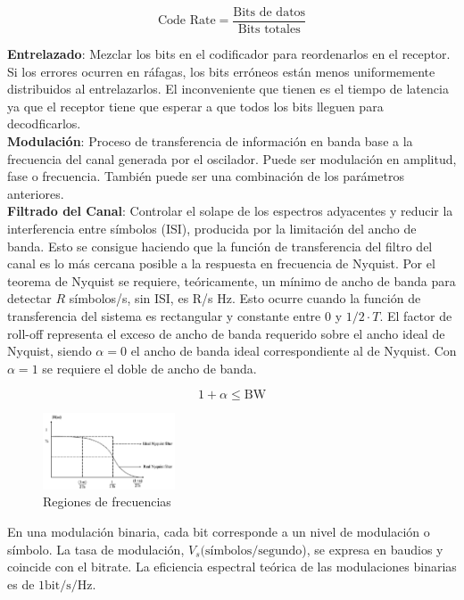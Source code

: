 \documentclass[10pt,portrait, twocolumn]{article}
\begin{document}
	\begin{equation*}
		\text{Code Rate} = \frac{\text{Bits de datos}}{\text{Bits totales}}
	\end{equation*}

\textbf{Entrelazado}:  Mezclar los bits en el codificador para reordenarlos en el receptor. Si los errores ocurren en ráfagas, los bits erróneos están menos uniformemente distribuidos al entrelazarlos. El inconveniente que tienen es el tiempo de latencia ya que el receptor tiene que esperar a que todos los bits lleguen para decodficarlos.\\

\textbf{Modulación}: Proceso de transferencia de información en banda base a la frecuencia del canal generada por el oscilador. Puede ser modulación en amplitud, fase o frecuencia. También puede ser una combinación de los parámetros anteriores.\\

\textbf{Filtrado del Canal}: Controlar el solape de los espectros adyacentes y reducir la interferencia entre símbolos (ISI), producida por la limitación del ancho de banda. Esto se consigue haciendo que la función de transferencia del filtro del canal es lo más cercana posible a la respuesta en frecuencia de Nyquist. Por el teorema de Nyquist se requiere, teóricamente, un mínimo de ancho de banda para detectar $R$ símbolos/s, sin ISI, es R/s Hz. Esto ocurre cuando la función de transferencia del sistema es rectangular y constante entre 0 y $1/2 \cdot T$. El factor de roll-off representa el exceso de ancho de banda requerido sobre el ancho ideal de Nyquist, siendo $\alpha = 0$ el ancho de banda ideal correspondiente al de Nyquist. Con $\alpha = 1$ se requiere el doble de ancho de banda.

	\begin{equation*}
	1 + \alpha \leq \text{BW}
	\end{equation*}
	
	\begin{figure}[h]
	\centering
       \includegraphics[width=0.35\textwidth]{Nyquist}
      \caption{Regiones de frecuencias}
\end{figure}

En una modulación binaria, cada bit corresponde a un nivel de modulación o símbolo. La tasa de modulación, $V_{s} (\text{símbolos} / \text{segundo}$), se expresa en baudios y coincide con el bitrate. La eficiencia espectral teórica de las modulaciones binarias es de $1 \text{bit}/\text{s}/\text{Hz}$.
\end{document}
